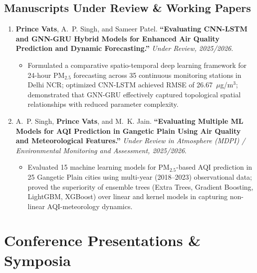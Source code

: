 \documentclass[10pt,a4paper]{article}
\newcommand{\pubitem}[4]{
    \item #1. \textbf{``#2.''} \textit{#3}. #4
}
\begin{document}
\subsection*{Manuscripts Under Review \& Working Papers}
\begin{enumerate}[resume]
    \pubitem{\textbf{Prince Vats}, A.~P. Singh, and Sameer Patel}
    {Evaluating CNN-LSTM and GNN-GRU Hybrid Models for Enhanced Air Quality Prediction and Dynamic Forecasting}
    {Under Review, 2025/2026}
    {}
    \begin{itemize}
        \item Formulated a comparative spatio-temporal deep learning framework for 24-hour PM$_{2.5}$ forecasting across 35 continuous monitoring stations in Delhi NCR; optimized CNN-LSTM achieved RMSE of 26.67~$\mu$g/m$^3$; demonstrated that GNN-GRU effectively captured topological spatial relationships with reduced parameter complexity.
    \end{itemize}
    \pubitem{A.~P. Singh, \textbf{Prince Vats}, and M.~K. Jain}
    {Evaluating Multiple ML Models for AQI Prediction in Gangetic Plain Using Air Quality and Meteorological Features}
    {Under Review in Atmosphere (MDPI) / Environmental Monitoring and Assessment, 2025/2026}
    {}
    \begin{itemize}
        \item Evaluated 15 machine learning models for PM$_{2.5}$-based AQI prediction in 25 Gangetic Plain cities using multi-year (2018--2023) observational data; proved the superiority of ensemble trees (Extra Trees, Gradient Boosting, LightGBM, XGBoost) over linear and kernel models in capturing non-linear AQI-meteorology dynamics.
    \end{itemize}
\end{enumerate}

\section{Conference Presentations \& Symposia}
\end{document}
